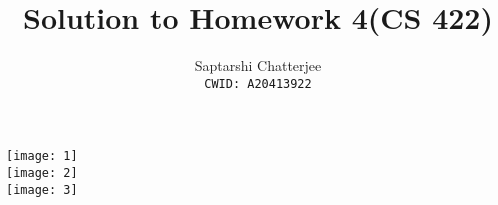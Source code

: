 \documentclass[3pt]{article}
\title{Solution to Homework 4(CS 422)}
\author{Saptarshi Chatterjee \\
\texttt{CWID: A20413922}
}
\begin{document}
\maketitle

\setlength{\parskip}{1.2em}
\setlength{\parindent}{0em}

\texttt{[image: 1]} \\

\texttt{[image: 2]} \\

\texttt{[image: 3]} \\
\end{document}
